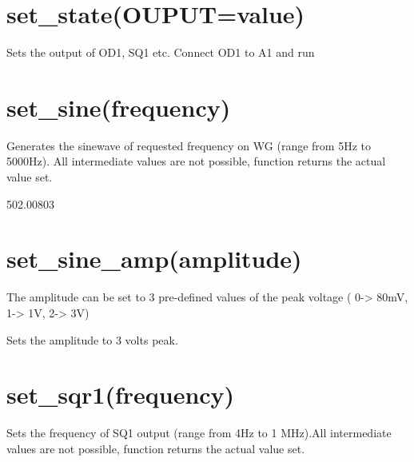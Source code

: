 \documentclass[a4paper,12pt,english]{sphinxmanual}
\begin{document}
\section{set\_state(OUPUT=value)}
\label{\detokenize{9.0:set-state-ouput-value}}
Sets the output of OD1, SQ1 etc. Connect OD1 to A1 and run

\begin{sphinxVerbatim}[commandchars=\\\{\}]
 
\end{sphinxVerbatim}


\section{set\_sine(frequency)}
\label{\detokenize{9.0:set-sine-frequency}}
Generates the sinewave of requested frequency on WG (range from 5Hz to
5000Hz). All intermediate values are not possible, function returns the
actual value set.

\begin{sphinxVerbatim}[commandchars=\\\{\}]
 
\end{sphinxVerbatim}

502.00803


\section{set\_sine\_amp(amplitude)}
\label{\detokenize{9.0:set-sine-amp-amplitude}}
The amplitude can be set to 3 pre-defined values of the peak voltage (
0-\textgreater{} 80mV, 1-\textgreater{} 1V, 2-\textgreater{} 3V)

\begin{sphinxVerbatim}[commandchars=\\\{\}]
\end{sphinxVerbatim}

Sets the amplitude to 3 volts peak.


\section{set\_sqr1(frequency)}
\label{\detokenize{9.0:set-sqr1-frequency}}
Sets the frequency of SQ1 output (range from 4Hz to 1 MHz).All
intermediate values are not possible, function returns the actual value
set.
\end{document}
